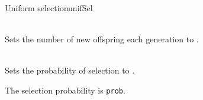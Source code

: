 

\begin{moduledoc}{Uniform selection}{unifSel}
  
\item[\KeyWord{NoOfOffsprings} \Param{k}]~\\
   Sets the number of new offspring each generation to .

\item[\KeyWord{selProb} \Param{$p_{sel}$}]~\\
  Sets the probability of selection to 
  .
  
\end{moduledoc}

The selection probability is \verb+prob+. 
